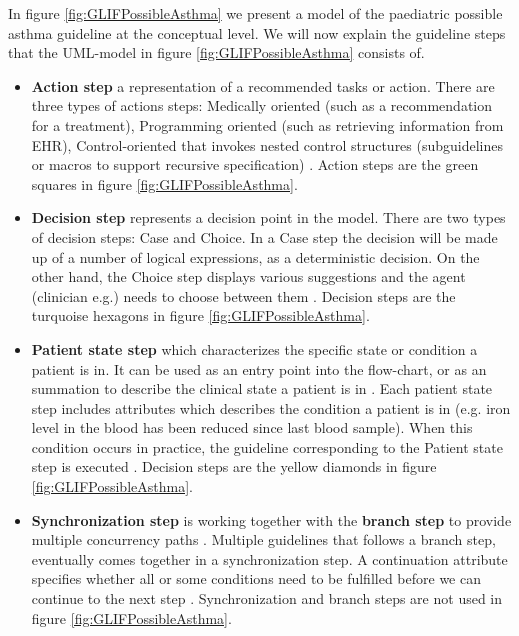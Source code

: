 \begin{itemize}
	In figure \ref{fig:GLIFPossibleAsthma} we present a model of the paediatric possible asthma guideline \parencite{RepublicofKeny2016} at the conceptual level. We will now explain the guideline steps that the UML-model in figure \ref{fig:GLIFPossibleAsthma} consists of.
	\begin{itemize}
		\item \textbf{Action step} a representation of a recommended tasks or action. There are three types of actions steps: Medically oriented (such as a recommendation for a treatment), Programming oriented (such as retrieving information from EHR), Control-oriented that invokes nested control structures (subguidelines or macros to support recursive specification) \parencite{DeClercq2008}. Action steps are the green squares in figure \ref{fig:GLIFPossibleAsthma}.
		\item \textbf{Decision step} represents a decision point in the model. There are two types of decision steps: Case and Choice. In a Case step the decision will be made up of a number of logical expressions, as a deterministic decision. On the other hand, the Choice step displays various suggestions and the agent (clinician e.g.) needs to choose between them \parencite{DeClercq2008}. Decision steps are the turquoise hexagons in figure \ref{fig:GLIFPossibleAsthma}.
		\item \textbf{Patient state step} which characterizes the specific state or condition a patient is in. It can	be used as an entry point into the 
flow-chart, or as an summation to describe the clinical state a patient is in \parencite{Boxwala2004}. Each patient state step includes attributes which describes the condition a patient is in (e.g. iron level in the blood has been reduced since last blood sample). When this condition occurs in practice, the guideline corresponding	to the Patient state step is executed \parencite{DeClercq2008}. Decision steps are the yellow diamonds in figure \ref{fig:GLIFPossibleAsthma}.
		\item \textbf{Synchronization step} is working together with the \textbf{branch step} to provide multiple concurrency paths \parencite{Boxwala2004}. Multiple guidelines that follows a branch step, eventually comes together in a synchronization step. A continuation attribute specifies	whether all or some conditions need to be fulfilled before we can continue to the next step \parencite{DeClercq2008}. Synchronization and branch steps are not used in figure \ref{fig:GLIFPossibleAsthma}.
	\end{itemize}
	 

\end{itemize}
